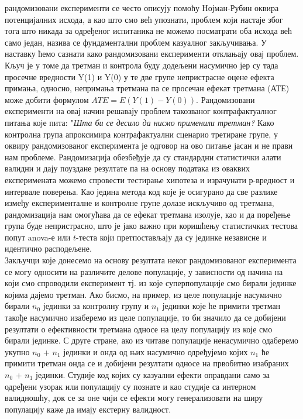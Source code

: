 \documentclass[12pt, a4paper]{article}
\begin{document}
рандомизовани експерименти се често описују помоћу Нојман-Рубин оквира потенцијалних исхода, 
а као што смо већ упознати, проблем који настаје због тога што никада за 
одређеног испитаника не можемо посматрати оба исхода већ само један, назива се фундаментални 
проблем казуалног закључивања. У наставку ћемо сазнати како рандомизовани експерименти 
отклањају овај проблем. Кључ је у томе да третман и контрола буду додељени насумично јер су тада 
просечне вредности Y(1) и Y(0) у те две групе непристрасне оцене ефекта примања, односно, 
непримања третмана па се просечан ефекат третмана (АТЕ) може добити формулом $ATE=E(Y(1)-Y(0))$.
Рандомизовани експерименти на овај начин решавају проблем такозваног контрафактуалног питања које 
пита: "\textit{Шта би се десило да нисмо применили третман?} Како контролна група апроксимира контрафактуални 
сценарио третиране групе, у оквиру рандомизованог експеримента је одговор на ово питање јасан и 
не прави нам проблеме. Рандомизација обезбеђује да су стандардни статистички алати валидни и дају 
поуздане резултате па на основу података из оваквих експеримената можемо спровести тестирање 
хипотеза и израчунати р-вредност и интервале поверења. Као једина метода код које је осигурано да 
све разлике између експерименталне и контролне групе долазе искључиво од третмана, рандомизација нам омогућава да се ефекат 
третмана изолује, као и да поређење група буде непристрасно, што је јако важно при коришћењу 
статистичких тестова попут anova-е или $t$-теста који претпостављају да су јединке независне и 
идентично расподељене.\\
Закључци које донесемо на основу резултата неког рандомизованог експеримента се могу односити на 
различите делове популације, у зависности од начина на који смо спроводили експеримент тј. из које 
суперпопулације смо бирали јединке којима дајемо третман. Ако бисмо, на пример, из целе популације 
насумично бирали $n_0$ јединки за контролну групу и $n_1$ јединки које ће примити третман такође 
насумично изаберемо из целе популације, то би значило да се добијени резултати о ефективности 
третмана односе на целу популацију из које смо бирали јединке.
С друге стране, ако из читаве популације ненасумично одаберемо укупно $n_0$ + $n_1$ јединки и онда 
од њих насумично одређујемо којих $n_1$ ће примити третман онда се и добијени резултати односе на 
првобитно изабраних $n_0$ + $n_1$ јединки. Студије код којих су казуални ефекти оправдани
само за одређени узорак или популацију су познате и као студије са интерном валидношћу, док се за 
оне чији се ефекти могу генерализовати на ширу популацију каже да имају екстерну валидност.
\end{document}

